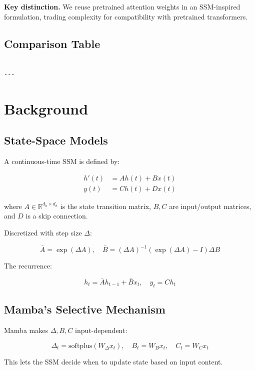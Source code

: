 \textbf{Key distinction.} We reuse pretrained attention weights in an SSM-inspired 
formulation, trading complexity for compatibility with pretrained transformers.



\subsection{Comparison Table}

\begin{lstlisting}

---
\end{lstlisting}

\section{Background}

\subsection{State-Space Models}

A continuous-time SSM is defined by:

\[
\begin{aligned}
h'(t) &= A h(t) + B x(t) \\
y(t) &= C h(t) + D x(t)
\end{aligned}
\tag{3.1}
\]

where $A \in \mathbb{R}^{d_h \times d_h}$ is the state transition matrix, 
$B, C$ are input/output matrices, and $D$ is a skip connection.

Discretized with step size $\Delta$:

\[
\bar{A} = \exp(\Delta A), \quad \bar{B} = (\Delta A)^{-1} (\exp(\Delta A) - I) \Delta B
\tag{3.2}
\]

The recurrence:

\[
h_t = \bar{A} h_{t-1} + \bar{B} x_t, \quad y_t = C h_t
\tag{3.3}
\]

\subsection{Mamba's Selective Mechanism}

Mamba makes $\Delta, B, C$ input-dependent:

\[
\Delta_t = \text{softplus}(W_\Delta x_t), \quad B_t = W_B x_t, \quad C_t = W_C x_t
\tag{3.4}
\]

This lets the SSM decide when to update state based on input content.

